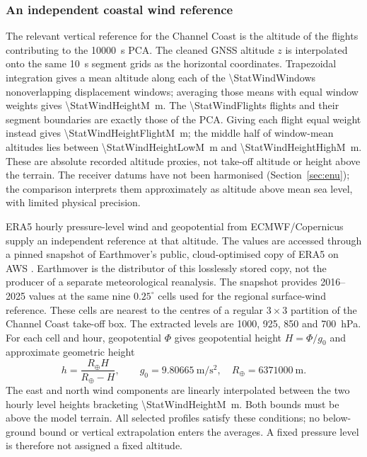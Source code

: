 \subsubsection{An independent coastal wind reference}
\label{sec:independent-coastal-wind}

The relevant vertical reference for the Channel Coast is the altitude of the
flights contributing to the \SI{10000}{\second} PCA. The cleaned GNSS altitude
$z$ is interpolated onto the same \SI{10}{\second} segment grids as the horizontal
coordinates. Trapezoidal integration gives a mean altitude along each of the
\num{\StatWindWindows} nonoverlapping displacement windows; averaging those
means with equal window weights gives \SI{\StatWindHeightM}{\metre}. The
\num{\StatWindFlights} flights and their segment boundaries are exactly those
of the PCA. Giving each flight equal weight instead gives
\SI{\StatWindHeightFlightM}{\metre}; the middle half of window-mean altitudes
lies between \SI{\StatWindHeightLowM}{\metre} and
\SI{\StatWindHeightHighM}{\metre}. These are absolute recorded altitude proxies,
not take-off altitude or height above the terrain. The receiver datums have
not been harmonised (Section~\ref{sec:enu}); the comparison interprets them
approximately as altitude above mean sea level, with limited physical precision.

ERA5 hourly pressure-level wind and geopotential from ECMWF/Copernicus
\cite{era5_pressure} supply an independent reference at that altitude. The
values are accessed through a pinned snapshot of Earthmover's public,
cloud-optimised copy of ERA5 on AWS \cite{earthmover_era5}. Earthmover is the
distributor of this losslessly stored copy, not the producer of a separate
meteorological reanalysis. The snapshot provides 2016--2025 values at the same
nine $0.25^\circ$ cells used for the regional surface-wind reference. These
cells are nearest to the centres of a regular $3\times3$ partition of the
Channel Coast take-off box. The extracted levels are 1000, 925, 850 and
\SI{700}{\hecto\pascal}. For each cell and hour, geopotential $\Phi$ gives
geopotential height $H=\Phi/g_0$ and approximate geometric height
\cite{ecmwf_geopotential_height}
\begin{equation}
 h=\frac{R_\oplus H}{R_\oplus-H},\qquad
 g_0=\SI[group-digits=false]{9.80665}{\metre\per\second\squared},\quad
 R_\oplus=\SI{6371000}{\metre}.
 \label{eq:wind-level-height}
\end{equation}
The east and north wind components are linearly interpolated between the two
hourly level heights bracketing \SI{\StatWindHeightM}{\metre}. Both bounds
must be above the model terrain. All selected profiles satisfy these conditions;
no below-ground bound or vertical extrapolation enters the averages. A fixed
pressure level is therefore not assigned a fixed altitude.

